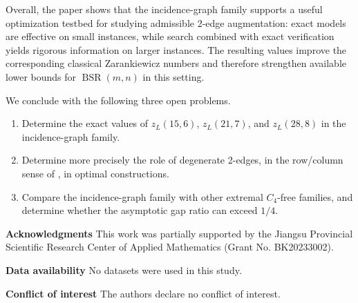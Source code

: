 \documentclass[10pt]{article}
\newcommand{\blue}[1]{#1}
\newcommand{\0}{\mathbf{0}}
\newcommand{\1}{\mathbf{1}}
\begin{document}
\blue{Overall, the paper shows that the incidence-graph family supports a useful optimization testbed for studying admissible 2-edge augmentation: exact models are effective on small instances, while search combined with exact verification yields rigorous information on larger instances. The resulting values improve the corresponding classical Zarankiewicz numbers and therefore strengthen available lower bounds for \(\operatorname{BSR}(m,n)\) in this setting.}

\blue{We conclude with the following three open problems.}
\begin{enumerate}
  \item Determine the exact values of \(z_L(15,6)\), \(z_L(21,7)\), and \(z_L(28,8)\) in the incidence-graph family.
  \item Determine more precisely the role of degenerate 2-edges, in the row/column sense of \cite{QCX26a}, in optimal constructions.
  \item Compare the incidence-graph family with other extremal \(C_4\)-free families, and determine whether the asymptotic gap ratio can exceed \(1/4\).
\end{enumerate}

\bigskip
	
	\noindent\textbf{Acknowledgments}
	This work was partially supported by the Jiangsu Provincial Scientific Research Center of Applied Mathematics (Grant No. BK20233002).
	
	\medskip
	
	\noindent\textbf{Data availability}
	No datasets were used in this study.
	
	\medskip
	
	\noindent\textbf{Conflict of interest} The authors declare no conflict of interest.
\end{document}
